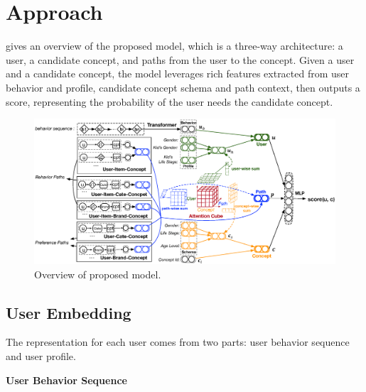 

\section{Approach}
\label{sec:model}
 gives an overview of the proposed model,
which is a three-way architecture: a user, a candidate concept, and paths from the user to the concept.
Given a user and a candidate concept, 
the model leverages rich features extracted from user behavior and profile, 
candidate concept schema and path context, then outputs a score, representing the probability of the user needs the candidate concept. 

\begin{figure}[th]
	\centering
	\includegraphics[width=2\columnwidth]{figures/model}
	\caption{Overview of proposed model.}
	\label{fig:model}
\end{figure}

\subsection{User Embedding}

The representation for each user comes from two parts: user behavior sequence and user profile.

\noindent
\textbf{User Behavior Sequence}

